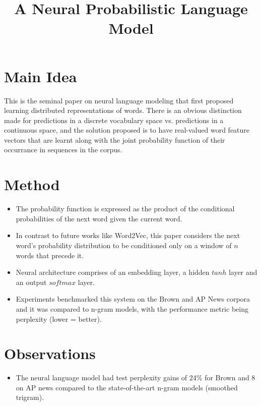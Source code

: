 \documentclass[12pt]{scrartcl}
\begin{document}
\title{A Neural Probabilistic Language Model}
\author{}
\date{}
\maketitle

\section{Main Idea}
  This is the seminal paper on neural language modeling that first proposed learning distributed representations of words. There is an obvious distinction made for predictions in a discrete vocabulary space vs. predictions in a continuous space, and the solution proposed is to have real-valued word feature vectors that are learnt along with the joint probability function of their occurrance in sequences in the corpus.

\section{Method}
  \begin{itemize}
    \item The probability function is expressed as the product of the conditional probabilities of the next word given the current word.
    \item In contrast to future works like Word2Vec, this paper considers the next word's probability distribution to be conditioned only on a window of $n$ words that precede it.
    \item Neural architecture comprises of an embedding layer, a hidden $tanh$ layer and an output $softmax$ layer.
    \item Experiments benchmarked this system on the Brown and AP News corpora and it was compared to n-gram models, with the performance metric being perplexity (lower = better).
  \end{itemize}

\section{Observations}
  \begin{itemize}
    \item The neural language model had test perplexity gains of 24\% for Brown and 8\* on AP news compared to the state-of-the-art n-gram models (smoothed trigram).
  \end{itemize}



\end{document}

